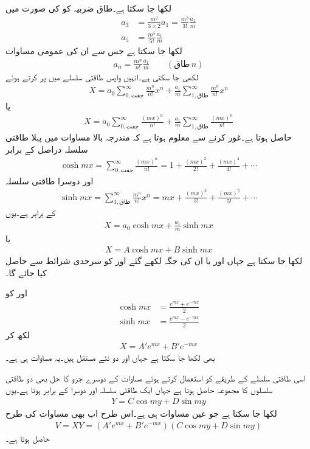 لکھا جا سکتا ہے۔طاق ضربیہ کو  کی صورت میں
\begin{align*}
a_3&=\frac{m^2}{3\times 2} a_1=\frac{m^3}{3!} \frac{a_1}{m}\\
a_5&=\frac{m^5}{5!}\frac{a_1}{m}
\end{align*}
لکھا جا سکتا ہے جس سے ان کی عمومی مساوات
\begin{align*}
a_n=\frac{m^n}{n!}\frac{a_1}{m} \quad \quad (\textrm{طاق} \, n)
\end{align*}
لکھی جا سکتی ہے۔انہیں واپس طاقتی سلسلے میں پر کرتے ہوئے
\begin{align*}
X=a_0 \sum_{0,\textrm{جفت}}^{\infty} \frac{m^n}{n!}x^n+\frac{a_1}{m}\sum_{1,\textrm{طاق}}^{\infty} \frac{m^n}{n!}x^n
\end{align*}
یا
\begin{align*}
X=a_0 \sum_{0,\textrm{جفت}}^{\infty} \frac{(mx)^n}{n!}+\frac{a_1}{m}\sum_{1,\textrm{طاق}}^{\infty} \frac{(mx)^n}{n!}
\end{align*}
حاصل ہوتا ہے۔غور کرنے سے معلوم ہوتا ہے کہ مندرجہ بالا مساوات میں پہلا طاقتی سلسلہ دراصل  کے برابر
\begin{align*}
\cosh mx=\sum_{0,\textrm{جفت}}^{\infty} \frac{(mx)^n}{n!}=1+\frac{(mx)^2}{2!}+\frac{(mx)^4}{4!}+\cdots
\end{align*}
 اور دوسرا طاقتی سلسلہ 
\begin{align*}
\sinh mx=\sum_{1,\textrm{طاق}}^{\infty} \frac{m^n}{n!}x^n=mx+\frac{(mx)^3}{3!}+\frac{(mx)^5}{5!}+\cdots
\end{align*}
کے برابر ہے۔یوں
\begin{align*}
X=a_0 \cosh mx+\frac{a_1}{m} \sinh mx
\end{align*}
یا
\begin{align*}
X=A \cosh mx+B \sinh mx
\end{align*}
لکھا جا سکتا ہے جہاں  اور  یا ان کی جگہ لکھے گئے  اور   کو سرحدی شرائط سے حاصل کیا جائے گا۔

 اور  کو
\begin{align*}
\cosh mx&=\frac{e^{mx}+e^{-mx}}{2}\\
\sinh mx&=\frac{e^{mx}-e^{-mx}}{2}
\end{align*}
لکھ کر 
\begin{align*}
X=A' e^{mx}+B' e^{-mx}
\end{align*}
بھی لکھا جا سکتا ہے جہاں  اور  دو نئے مستقل ہیں۔یہ مساوات  ہی ہے۔

اسی طاقتی سلسلے کے طریقے کو استعمال کرتے ہوئے مساوات  کے دوسرے جزو کا حل بھی دو طاقتی سلسلوں کا مجموعہ حاصل ہوتا ہے جہاں ایک طاقتی سلسلہ  اور دوسرا  کے برابر ہوتا ہے۔یوں
\begin{align}
Y=C\cos my+D\sin my
\end{align}
لکھا جا سکتا ہے جو عین مساوات  ہی ہے۔اس طرح اب بھی مساوات  کی طرح
\begin{align}\label{مساوات_لاپلاس_اندازہ_ت}
V=XY=\left(A' e^{mx}+B' e^{-m x} \right) \left(C \cos m y+D \sin m y \right)
\end{align}
حاصل ہوتا ہے۔
